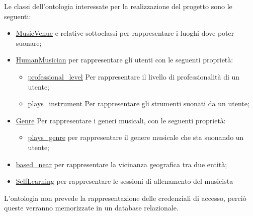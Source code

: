 \documentclass[12pt, a4paper]{article}
\begin{document}
Le classi dell'ontologia interessate per la realizzazione del progetto sono le seguenti:
\begin{itemize}
    \item \href{https://schema.org/MusicVenue}{MusicVenue} e relative sottoclassi per rappresentare i luoghi dove poter suonare;
    \item \href{http://purl.org/ontology/musico#HumanMusician}{HumanMusician} per rappresentare gli utenti con le seguenti proprietà:
          \begin{itemize}
              \item  \href{http://purl.org/ontology/musico#professional_level}{professional\_level} Per rappresentare il livello di professionalità di un utente;
              \item \href{http://purl.org/ontology/musico#plays_instrument}{plays\_instrument} Per rappresentare gli strumenti suonati da un utente;
          \end{itemize}
    \item \href{http://purl.org/ontology/mo/Genre}{Genre} Per rappresentare i generi musicali, con le seguenti proprietà:
          \begin{itemize}
              \item \href{http://purl.org/ontology/musico\#plays\_genre}{plays\_genre} per rappresentare il genere musicale che sta suonando un utente;
          \end{itemize}
    \item \href{http://xmlns.com/foaf/0.1/based_near}{based\_near} per rappresentare la vicinanza geografica tra due entità;
    \item \href{http://purl.org/ontology/musico/SelfLearning}{SelfLearning} per rappresentare le sessioni di allenamento del musicista
\end{itemize}

L'ontologia non prevede la rappresentazione delle credenziali di accesso, perciò queste verranno memorizzate in un database relazionale.
\end{document}
